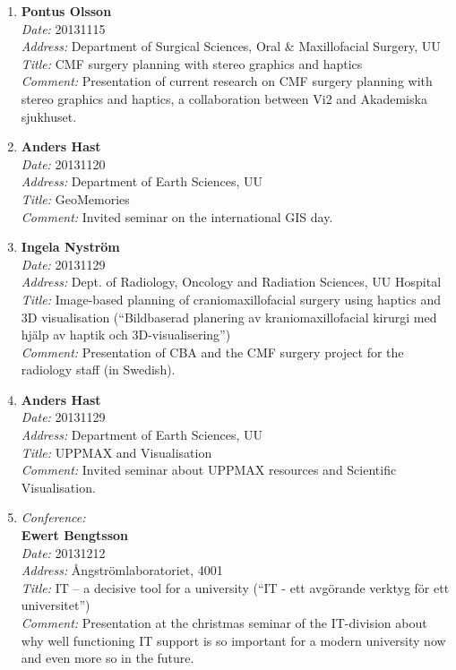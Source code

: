 \begin{enumerate}
\item 
{\bf Pontus Olsson}~\\
{\em Date:} 20131115~\\
{\em Address:} Department of Surgical Sciences, Oral \& Maxillofacial Surgery, UU~\\
{\em Title:} CMF surgery planning with stereo graphics and haptics~\\
{\em Comment:} Presentation of current research on CMF surgery planning with stereo graphics and haptics, a collaboration between Vi2 and Akademiska sjukhuset.


\item 
{\bf Anders Hast}~\\
{\em Date:} 20131120~\\
{\em Address:} Department of Earth Sciences, UU~\\
{\em Title:} GeoMemories~\\
{\em Comment:} Invited seminar on the international GIS day.


\item 
{\bf Ingela Nystr\"{o}m}~\\
{\em Date:} 20131129~\\
{\em Address:} Dept. of Radiology, Oncology and Radiation Sciences, UU Hospital~\\
{\em Title:} Image-based planning of craniomaxillofacial surgery using haptics and 3D visualisation (``Bildbaserad planering av kraniomaxillofacial kirurgi med hj\"{a}lp av haptik och 3D-visualisering'')~\\
{\em Comment:} Presentation of CBA and the CMF surgery project for the radiology staff (in Swedish).


\item 
{\bf Anders Hast}~\\
{\em Date:} 20131129~\\
{\em Address:} Department of Earth Sciences, UU~\\
{\em Title:} UPPMAX and Visualisation~\\
{\em Comment:} Invited seminar about UPPMAX resources and Scientific Visualisation.

\item 
{\em Conference:} ~\\
{\bf Ewert Bengtsson}~\\
{\em Date:} 20131212~\\
{\em Address:} \AA ngstr\"{o}mlaboratoriet, 4001~\\
{\em Title:} IT -- a decisive tool for a university (``IT - ett avg\"{o}rande verktyg f\"{o}r ett universitet'')~\\
{\em Comment:} Presentation at the christmas seminar of the IT-division about why well functioning IT support is so important for a modern university now and even more so in the future.

\end{enumerate}


